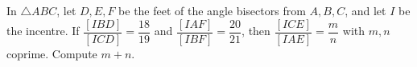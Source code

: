 In $\triangle ABC$, let $D,E,F$ be the feet of the angle bisectors from $A,B,C$, and let $I$ be the incentre. If $\dfrac{[IBD]}{[ICD]}=\dfrac{18}{19}$ and $\dfrac{[IAF]}{[IBF]}=\dfrac{20}{21}$, then $\dfrac{[ICE]}{[IAE]}=\dfrac mn$ with $m,n$ coprime. Compute $m+n$.

